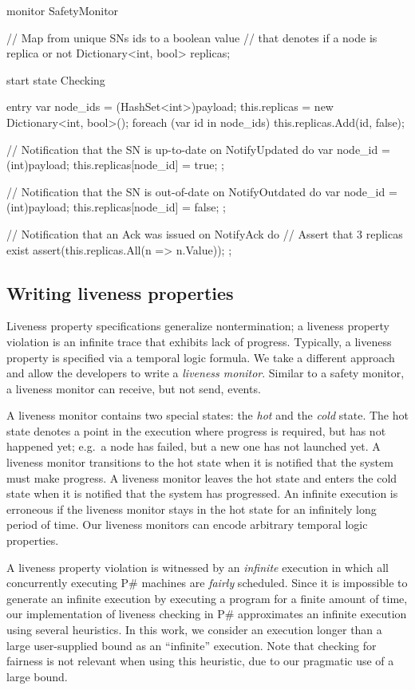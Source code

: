 \documentclass{llncs}
\newcommand{\ps}{P\#\xspace}
\begin{document}
\begin{psharp}
monitor SafetyMonitor {
  // Map from unique SNs ids to a boolean value
  // that denotes if a node is replica or not
  Dictionary<int, bool> replicas;

  start state Checking {
    entry {
      var node_ids = (HashSet<int>)payload;
      this.replicas = new Dictionary<int, bool>();
      foreach (var id in node_ids) {
        this.replicas.Add(id, false);
      }
    }
    
    // Notification that the SN is up-to-date
    on NotifyUpdated do {
      var node_id = (int)payload;
      this.replicas[node_id] = true;
    };
    
    // Notification that the SN is out-of-date
    on NotifyOutdated do {
      var node_id = (int)payload;
      this.replicas[node_id] = false;
    };
    
    // Notification that an Ack was issued
    on NotifyAck do {
      // Assert that 3 replicas exist
      assert(this.replicas.All(n => n.Value));
    };
  }
}
\end{psharp}

\subsection{Writing liveness properties}
\label{sec:advanced:liveness}

Liveness property specifications generalize nontermination; a liveness property violation is an infinite trace that exhibits lack of progress. Typically, a liveness property is specified via a temporal logic formula. We take a different approach and allow the developers to write a \emph{liveness monitor}. Similar to a safety monitor, a liveness monitor can receive, but not send, events.

A liveness monitor contains two special states: the \emph{hot} and the \emph{cold} state. The hot state denotes a point in the execution where progress is required, but has not happened yet; e.g.\ a node has failed, but a new one has not launched yet. A liveness monitor transitions to the hot state when it is notified that the system must make progress. A liveness monitor leaves the hot state and enters the cold state when it is notified that the system has progressed. An infinite execution is erroneous if the liveness monitor stays in the hot state for an infinitely long period of time. Our liveness monitors can encode arbitrary temporal logic properties.

A liveness property violation is witnessed by an \emph{infinite} execution in which all concurrently executing \ps machines are \emph{fairly} scheduled. Since it is impossible to generate an infinite execution by executing a program for a finite amount of time, our implementation of liveness checking in \ps approximates an infinite execution using several heuristics. In this work, we consider an execution longer than a large user-supplied bound as an ``infinite'' execution. Note that checking for fairness is not relevant when using this heuristic, due to our pragmatic use of a large bound.
\end{document}
